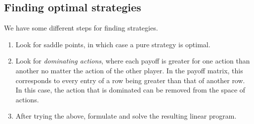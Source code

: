 \documentclass[../Main.tex]{subfiles}
\begin{document}
\subsection{Finding optimal strategies}
We have some different steps for finding strategies.
\begin{enumerate}
    \item Look for saddle points, in which case a pure strategy is optimal.
    \item Look for \textit{dominating actions}, where each payoff is greater for one action than another no matter the action of the other player. In the payoff matrix, this corresponds to every entry of a row being greater than that of another row. In this case, the action that is dominated can be removed from the space of actions.
    \item After trying the above, formulate and solve the resulting linear program.
\end{enumerate}
\end{document}
